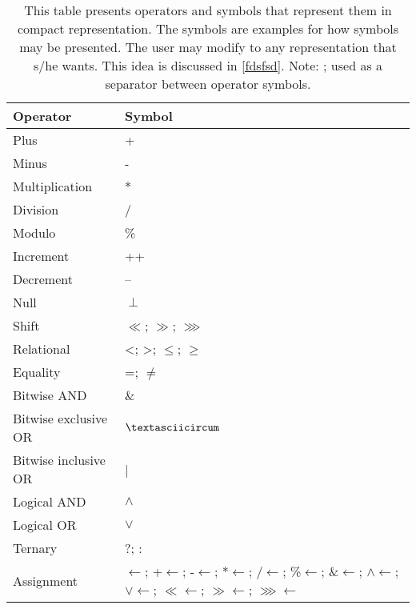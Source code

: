 \begin{table}[H]
\centering
\begin{tabular}{|l|l|}
\hline
{\bf Operator} & {\bf Symbol} \\ \hline
Plus & + \\ \hline
Minus & - \\ \hline
Multiplication & * \\ \hline
Division & / \\ \hline
Modulo & \% \\ \hline
Increment & ++ \\ \hline
Decrement & -- \\ \hline
Null & $ \perp $ \\ \hline
Shift & $ \ll $; $ \gg $; $ \ggg $ \\ \hline
Relational & <; >; $ \leq $; $ \geq $ \\ \hline
Equality & =; $ \neq $ \\ \hline
Bitwise AND & \& \\ \hline
Bitwise exclusive OR & $ \textasciicircum $ \\ \hline
Bitwise inclusive OR & | \\ \hline
Logical AND & $ \wedge $  \\ \hline
Logical OR & $ \vee $  \\ \hline
Ternary & ?; : \\ \hline
Assignment & $ \longleftarrow $; +$ \longleftarrow $; -$ \longleftarrow $; *$ \longleftarrow $; /$ \longleftarrow $; \%$ \longleftarrow $; \&$ \longleftarrow $; $ \wedge $$ \longleftarrow $; $ \vee $$ \longleftarrow $; $ \ll $$ \longleftarrow $; $ \gg $$ \longleftarrow $; $ \ggg $$ \longleftarrow $\\ \hline
\end{tabular}
\caption{This table presents operators and symbols that represent them in compact representation. The symbols are examples for how symbols may be presented. The user may modify to any representation that s/he wants. This idea is discussed in \ref{fdsfsd}. Note: ; used as a separator between operator symbols.}
\end{table}